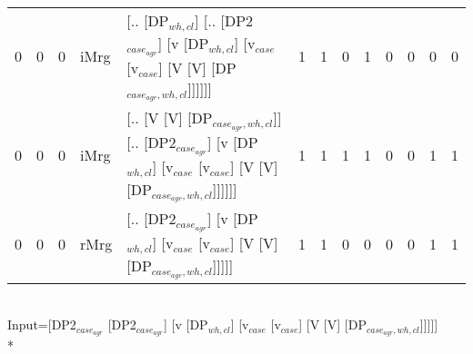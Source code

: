 \begin{tabularx}{\linewidth}{rrrlXrrrrrrrr}
   0 &       0 &   0 & iMrg & [.. [DP$_{wh,cl}$] [.. [DP2$_{case_{agr}}$] [v [DP$_{wh,cl}$] [v$_{case}$ [v$_{case}$] [V [V] [DP$_{case_{agr},wh,cl}$]]]]]]                                                   &             1 &             1 &                  0 &            1 &             0 &            0 &        0 &        0 \\
   0 &       0 &   0 & iMrg & [.. [V [V] [DP$_{case_{agr},wh,cl}$]] [.. [DP2$_{case_{agr}}$] [v [DP$_{wh,cl}$] [v$_{case}$ [v$_{case}$] [V [V] [DP$_{case_{agr},wh,cl}$]]]]]]                                  &             1 &             1 &                  1 &            1 &             0 &            0 &        1 &        1 \\
   0 &       0 &   0 & rMrg & [.. [DP2$_{case_{agr}}$] [v [DP$_{wh,cl}$] [v$_{case}$ [v$_{case}$] [V [V] [DP$_{case_{agr},wh,cl}$]]]]]                                                                   &             1 &             1 &                  0 &            0 &             0 &            0 &        1 &        1 \\
\hline
\end{tabularx}\endgroup\\
\begingroup\scriptsize Input=[DP2$_{case_{agr}}$ [DP2$_{case_{agr}}$] [v [DP$_{wh,cl}$] [v$_{case}$ [v$_{case}$] [V [V] [DP$_{case_{agr},wh,cl}$]]]]]\\*
